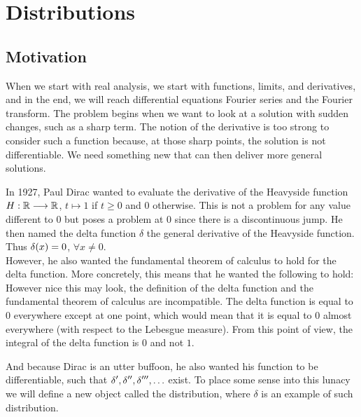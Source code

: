 \documentclass[11pt, openright]{book}
\begin{document}



\newpage

\section{Distributions}

\subsection{Motivation}

When we start with real analysis, we start with functions, limits, and derivatives, and in the end, we will reach differential equations Fourier series and the Fourier transform. The problem begins when we want to look at a solution with sudden changes, such as a sharp term. The notion of the derivative is too strong to consider such a function because, at those sharp points, the solution is not differentiable. We need something new that can then deliver more general solutions.

\begin{example}
    In 1927, Paul Dirac wanted to evaluate the derivative of the Heavyside function $H: \mathbb{R} \longrightarrow \mathbb{R}$, $t \longmapsto 1$ if $t \geq 0$ and $0$ otherwise. This is not a problem for any value different to $0$ but poses a problem at $0$ since there is a discontinuous jump. He then named the delta function $\delta$ the general derivative of the Heavyside function. Thus $\displaystyle{\delta(x)=0}$, $\forall x \neq 0$. \\
    However, he also wanted the fundamental theorem of calculus to hold for the delta function. More concretely, this means that he wanted the following to hold:
    However nice this may look, the definition of the delta function and the fundamental theorem of calculus are incompatible. The delta function is equal to $0$ everywhere except at one point, which would mean that it is equal to $0$ almost everywhere (with respect to the Lebesgue measure). From this point of view, the integral of the delta function is $0$ and not $1$.

    And because Dirac is an utter buffoon, he also wanted his function to be differentiable, such that $\displaystyle{\delta',\delta'',\delta''',\ldots}$ exist. To place some sense into this lunacy we will define a new object called the distribution, where $\delta$ is an example of such distribution.
\end{example}
\end{document}
